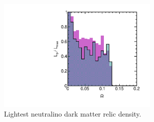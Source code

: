 \begin{figure}[htbp]
\begin{center}
\includegraphics[height=5.5cm]{figs/fig_omega_m.pdf} 
\caption{Lightest neutralino dark matter relic density.}
\label{default}
\end{center}
\end{figure}


